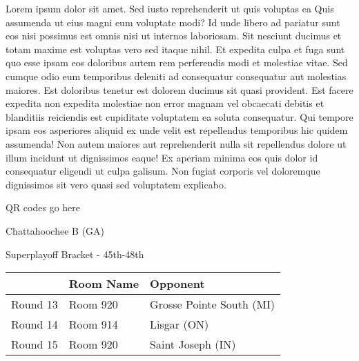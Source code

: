 \documentclass{article}%
\begin{document}
\vspace*{8pt}%
\linebreak%
\newline%
\newline%
Lorem ipsum dolor sit amet. Sed iusto reprehenderit ut quis voluptas ea Quis assumenda ut eius magni eum voluptate modi? Id unde libero ad pariatur sunt eos nisi possimus est omnis nisi ut internos laboriosam. Sit nesciunt ducimus et totam maxime est voluptas vero sed itaque nihil. Et expedita culpa et fuga sunt quo esse ipsam eos doloribus autem rem perferendis modi et molestiae vitae.\newline%
\newline%
Sed cumque odio eum temporibus deleniti ad consequatur consequatur aut molestias maiores. Est doloribus tenetur est dolorem ducimus sit quasi provident. Est facere expedita non expedita molestiae non error magnam vel obcaecati debitis et blanditiis reiciendis est cupiditate voluptatem ea soluta consequatur. Qui tempore ipsam eos asperiores aliquid ex unde velit est repellendus temporibus hic quidem assumenda!\newline%
\newline%
Non autem maiores aut reprehenderit nulla sit repellendus dolore ut illum incidunt ut dignissimos eaque! Ex aperiam minima eos quis dolor id consequatur eligendi ut culpa galisum. Non fugiat corporis vel doloremque dignissimos sit vero quasi sed voluptatem explicabo.\newline%
\newline%
%
\vspace*{30pt}%
\begin{center}%
\begin{Huge}%
QR codes go here%
\end{Huge}%
\end{center}%
\newpage%
\begin{center}%
\begin{Huge}%
Chattahoochee B (GA)%
\end{Huge}%
\vspace*{8pt}%
\linebreak%
\begin{Large}%
Superplayoff Bracket {-} 45th{-}48th%
\end{Large}%
\end{center}%
%
\begin{tabularx}{\textwidth}{|c|Y|Y|}%
\hline%
&Room Name&Opponent\\%
\hline%
Round 13&Room 920&Grosse Pointe South (MI)\\%
Round 14&Room 914&Lisgar (ON)\\%
Round 15&Room 920&Saint Joseph (IN)\\%
\hline%
\end{tabularx}%
\end{document}
